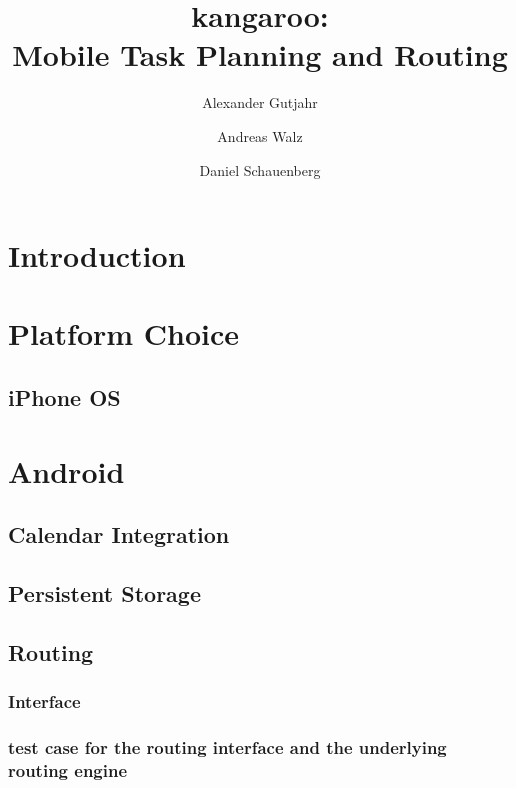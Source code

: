 \documentclass[11pt,a4paper]{scrreprt}
\begin{document}
\title{kangaroo: \\ Mobile Task Planning and Routing}
\author{Alexander Gutjahr \and Andreas Walz \and
        Daniel Schauenberg}

\maketitle

\tableofcontents

\chapter{Introduction} %
\label{chp:introduction}


\chapter{Platform Choice} %
\label{chp:platform_choice}
%

\section{iPhone OS} %
\label{sec:iphone}


\chapter{Android} %
\label{chp:android}
%

\section{Calendar Integration} %
\label{sec:android_calendar}


\section{Persistent Storage} %
\label{sec:android_pers_storage}


\section{Routing} %
\label{sec:android_pers_storage}

\subsection{Interface} %
\label{sub:routing_interface}


\subsection{test case for the routing interface and the underlying routing engine}
\label{sub:routing_testcase}




%
%
\end{document}
